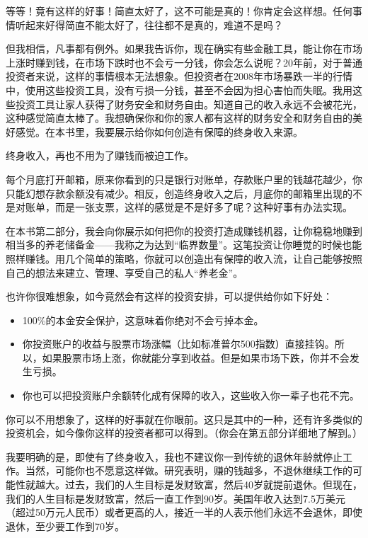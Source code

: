 等等！竟有这样的好事！简直太好了，这不可能是真的！你肯定会这样想。任何事情听起来好得简直不能太好了，往往都不是真的，难道不是吗？

但我相信，凡事都有例外。如果我告诉你，现在确实有些金融工具，能让你在市场上涨时赚到钱，在市场下跌时也不会亏一分钱，你会怎么说呢？20年前，对于普通投资者来说，这样的事情根本无法想象。但投资者在2008年市场暴跌一半的行情中，使用这些投资工具，没有亏损一分钱，甚至不会因为担心害怕而失眠。我用这些投资工具让家人获得了财务安全和财务自由。知道自己的收入永远不会被花光，这种感觉简直太棒了。我想确保你和你的家人都有这样的财务安全和财务自由的美好感觉。在本书里，我要展示给你如何创造有保障的终身收入来源。

终身收入，再也不用为了赚钱而被迫工作。

每个月底打开邮箱，原来你看到的只是银行对账单，存款账户里的钱越花越少，你只能幻想存款余额没有减少。相反，创造终身收入之后，月底你的邮箱里出现的不是对账单，而是一张支票，这样的感觉是不是好多了呢？这种好事有办法实现。

在本书第二部分，我会向你展示如何把你的投资打造成赚钱机器，让你稳稳地赚到相当多的养老储备金——我称之为达到“临界数量”。这笔投资让你睡觉的时候也能照样赚钱。用几个简单的策略，你就可以创造出有保障的收入流，让自己能够按照自己的想法来建立、管理、享受自己的私人“养老金”。

也许你很难想象，如今竟然会有这样的投资安排，可以提供给你如下好处：

\begin{itemize}
\item 100\%的本金安全保护，这意味着你绝对不会亏掉本金。
\item 你投资账户的收益与股票市场涨幅（比如标准普尔500指数）直接挂钩。所以，如果股票市场上涨，你就能分享到收益。但是如果市场下跌，你并不会发生亏损。
\item 你也可以把投资账户余额转化成有保障的收入，这些收入你一辈子也花不完。
\end{itemize}

你可以不用想象了，这样的好事就在你眼前。这只是其中的一种，还有许多类似的投资机会，如今像你这样的投资者都可以得到。（你会在第五部分详细地了解到。）

我要明确的是，即使有了终身收入，我也不建议你一到传统的退休年龄就停止工作。当然，可能你也不愿意这样做。研究表明，赚的钱越多，不退休继续工作的可能性就越大。过去，我们的人生目标是发财致富，然后40岁就提前退休。但现在，我们的人生目标是发财致富，然后一直工作到90岁。美国年收入达到7.5万美元（超过50万元人民币）或者更高的人，接近一半的人表示他们永远不会退休，即使退休，至少要工作到70岁。

